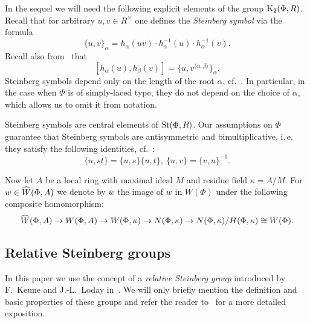 In the sequel we will need the following explicit elements of the group $\operatorname{K}_2(\Phi, R)$.
Recall that for arbitrary $u, v \in R^\times$ one defines the \textit{Steinberg symbol} via the formula
\begin{equation} \label{eq:steinberg} \{ u, v \}_\alpha = h_\alpha(uv) \cdot h_\alpha^{-1}(u) \cdot h_\alpha^{-1}(v). \end{equation}
Recall also from~\cite[Lemme~5.4]{Ma69} that
\begin{equation} \label{eq:steinberg-2} [h_\alpha(u), h_\beta(v)] = \{u, v^{\langle \alpha, \beta \rangle}\}_\alpha. \end{equation}
Steinberg symbols depend only on the length of the root $\alpha$, cf.~\cite[pp.~26--28]{Ma69}.
In particular, in the case when $\Phi$ is of simply-laced type, they do not depend on the choice of $\alpha$, which allows us to omit it from notation.

Steinberg symbols are central elements of $\operatorname{St}(\Phi, R)$.
Our assumptions on $\Phi$ guarantee that Steinberg symbols are antisymmetric and bimultiplicative, i.\,e. they satisfy the following identities, cf.~\cite[Lemme~2.4]{Ma69}:
\begin{equation} \label{eq:symbol-properties} \{ u, st \} = \{ u, s\} \{ u, t \}, \ \{ u, v \} = \{ v, u\}^{-1}. \end{equation}

Now let $A$ be a local ring with maximal ideal $M$ and residue field $\kappa = A/M$.
For $w \in \widehat{W}(\Phi, A)$ we denote by $\overline{w}$ the image of $w$ in $W(\Phi)$ under the following composite homomorphism:
\[ \widehat{W}(\Phi, A) \to W(\Phi, A) \to W(\Phi, \kappa) \to N(\Phi, \kappa) \to N(\Phi, \kappa) / H(\Phi, \kappa) \cong W(\Phi). \]

\subsection{Relative Steinberg groups} \label{subsec:another-presentation}
In this paper we use the concept of a \textit{relative Steinberg group} introduced by F.~Keune and J.-L.~Loday in~\cite{Ke78, Lo78}.
We will only briefly mention the definition and basic properties of these groups and refer the reader to~\cite[\S~2.3]{LS20} for a more detailed exposition.

